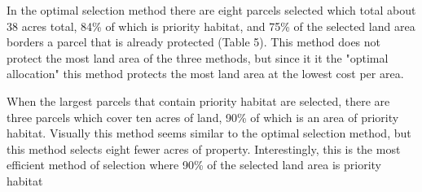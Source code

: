 \documentclass[12pt, stu, floatsintext,table]{apa7}
\begin{document}
In the optimal selection method there are eight parcels selected which total about 38 acres total, 84\% of which is priority habitat, and 75\% of the selected land area borders a parcel that is already protected (Table 5). This method does not protect the most land area of the three methods, but since it it the "optimal allocation" this method protects the most land area at the lowest cost per area. 

When the largest parcels that contain priority habitat are selected, there are three parcels which cover ten acres of land, 90\% of which is an area of priority habitat. Visually this method seems similar to the optimal selection method, but this method selects eight fewer acres of property. Interestingly, this is the most efficient method of selection where 90\% of the selected land area is priority habitat
\end{document}
